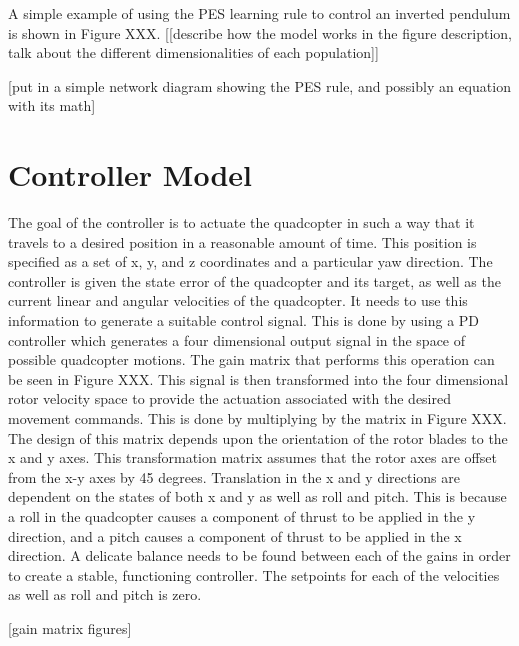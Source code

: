 \documentclass[letterpaper,12pt,titlepage,oneside,final]{book}
\begin{document}
A simple example of using the PES learning rule to control an inverted pendulum is shown in Figure XXX. [[describe how the model works in the figure description, talk about the different dimensionalities of each population]]

[put in a simple network diagram showing the PES rule, and possibly an equation with its math]

\section{Controller Model}


The goal of the controller is to actuate the quadcopter in such a way that it travels to a desired position in a reasonable amount of time. This position is specified as a set of x, y, and z coordinates and a particular yaw direction. The controller is given the state error of the quadcopter and its target, as well as the current linear and angular velocities of the quadcopter. It needs to use this information to generate a suitable control signal.
This is done by using a PD controller which generates a four dimensional output signal in the space of possible quadcopter motions. The gain matrix that performs this operation can be seen in Figure XXX. This signal is then transformed into the four dimensional rotor velocity space to provide the actuation associated with the desired movement commands. This is done by multiplying by the matrix in Figure XXX. The design of this matrix depends upon the orientation of the rotor blades to the x and y axes. This transformation matrix assumes that the rotor axes are offset from the x-y axes by 45 degrees.
Translation in the x and y directions are dependent on the states of both x and y as well as roll and pitch. This is because a roll in the quadcopter causes a component of thrust to be applied in the y direction, and a pitch causes a component of thrust to be applied in the x direction.
A delicate balance needs to be found between each of the gains in order to create a stable, functioning controller. The setpoints for each of the velocities as well as roll and pitch is zero.

[gain matrix figures]
\end{document}
